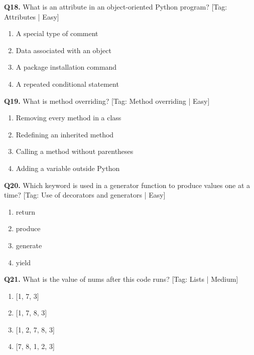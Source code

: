 \vspace{2mm}
\noindent\textbf{Q18.} What is an attribute in an object-oriented Python program? \hfill [Tag: Attributes | Easy]
\begin{enumerate}[label=(\alph*),topsep=2pt,itemsep=1pt,partopsep=0pt,parsep=0pt]
    \item {A special type of comment}
    \item {Data associated with an object}
    \item {A package installation command}
    \item {A repeated conditional statement}
\end{enumerate}
\vspace{2mm}
\noindent\textbf{Q19.} What is method overriding? \hfill [Tag: Method overriding | Easy]
\begin{enumerate}[label=(\alph*),topsep=2pt,itemsep=1pt,partopsep=0pt,parsep=0pt]
    \item {Removing every method in a class}
    \item {Redefining an inherited method}
    \item {Calling a method without parentheses}
    \item {Adding a variable outside Python}
\end{enumerate}
\vspace{2mm}
\noindent\textbf{Q20.} Which keyword is used in a generator function to produce values one at a time? \hfill [Tag: Use of decorators and generators | Easy]
\begin{enumerate}[label=(\alph*),topsep=2pt,itemsep=1pt,partopsep=0pt,parsep=0pt]
    \item {return}
    \item {produce}
    \item {generate}
    \item {yield}
\end{enumerate}
\vspace{2mm}
\noindent\textbf{Q21.} What is the value of nums after this code runs? \hfill [Tag: Lists | Medium]
\begin{enumerate}[label=(\alph*),topsep=2pt,itemsep=1pt,partopsep=0pt,parsep=0pt]
    \item {[1, 7, 3]}
    \item {[1, 7, 8, 3]}
    \item {[1, 2, 7, 8, 3]}
    \item {[7, 8, 1, 2, 3]}
\end{enumerate}
\vspace{2mm}
